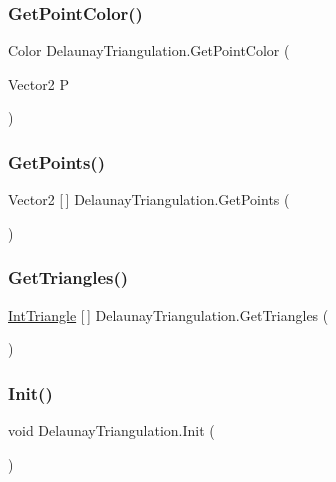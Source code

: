 \subsubsection{\texorpdfstring{Get\+Point\+Color()}{GetPointColor()}}
{\footnotesize\ttfamily Color Delaunay\+Triangulation.\+Get\+Point\+Color (\begin{DoxyParamCaption}\item[{Vector2}]{P }\end{DoxyParamCaption})}

\mbox{\label{class_delaunay_triangulation_a44384b9db3229395f862673e9ec03296}} 
\subsubsection{\texorpdfstring{Get\+Points()}{GetPoints()}}
{\footnotesize\ttfamily Vector2 \mbox{[}$\,$\mbox{]} Delaunay\+Triangulation.\+Get\+Points (\begin{DoxyParamCaption}{ }\end{DoxyParamCaption})}

\mbox{\label{class_delaunay_triangulation_a1b55615a70f1a68c150f397be89357bf}} 
\subsubsection{\texorpdfstring{Get\+Triangles()}{GetTriangles()}}
{\footnotesize\ttfamily \mbox{\hyperlink{struct_int_triangle}{Int\+Triangle}} \mbox{[}$\,$\mbox{]} Delaunay\+Triangulation.\+Get\+Triangles (\begin{DoxyParamCaption}{ }\end{DoxyParamCaption})}

\mbox{\label{class_delaunay_triangulation_a0edb936dc23053ec75ffecfb7a426c03}} 
\subsubsection{\texorpdfstring{Init()}{Init()}}
{\footnotesize\ttfamily void Delaunay\+Triangulation.\+Init (\begin{DoxyParamCaption}{ }\end{DoxyParamCaption})}


